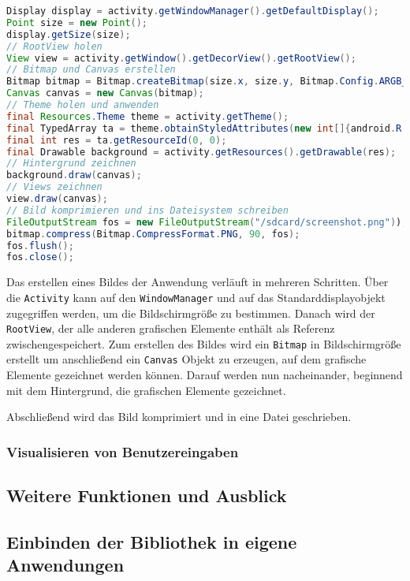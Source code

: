 \begin{lstlisting}[label=listing:screenshot,language=Java, caption=Screenshot Aufnahme ohne Root-Zugriff]
Display display = activity.getWindowManager().getDefaultDisplay();
Point size = new Point();
display.getSize(size);
// RootView holen
View view = activity.getWindow().getDecorView().getRootView();
// Bitmap und Canvas erstellen
Bitmap bitmap = Bitmap.createBitmap(size.x, size.y, Bitmap.Config.ARGB_4444);
Canvas canvas = new Canvas(bitmap);
// Theme holen und anwenden
final Resources.Theme theme = activity.getTheme();
final TypedArray ta = theme.obtainStyledAttributes(new int[]{android.R.attr.windowBackground});
final int res = ta.getResourceId(0, 0);
final Drawable background = activity.getResources().getDrawable(res);
// Hintergrund zeichnen
background.draw(canvas);
// Views zeichnen
view.draw(canvas);
// Bild komprimieren und ins Dateisystem schreiben
FileOutputStream fos = new FileOutputStream("/sdcard/screenshot.png"));
bitmap.compress(Bitmap.CompressFormat.PNG, 90, fos);
fos.flush();
fos.close();
\end{lstlisting}

Das erstellen eines Bildes der Anwendung verläuft in mehreren Schritten.
Über die \texttt{Activity} kann auf den \texttt{WindowManager} und auf das Standarddisplayobjekt zugegriffen werden, um die Bildschirmgröße zu bestimmen.
Danach wird der \texttt{RootView}, der alle anderen grafischen Elemente enthält als Referenz zwischengespeichert.
Zum erstellen des Bildes wird ein \texttt{Bitmap} in Bildschirmgröße erstellt um anschließend ein \texttt{Canvas} Objekt zu erzeugen, auf dem grafische Elemente gezeichnet werden können.
Darauf werden nun nacheinander, beginnend mit dem Hintergrund, die grafischen Elemente gezeichnet.

Abschließend wird das Bild komprimiert und in eine Datei geschrieben.

\subsubsection{Visualisieren von Benutzereingaben}

\subsection{Weitere Funktionen und Ausblick}

\subsection{Einbinden der Bibliothek in eigene Anwendungen}


